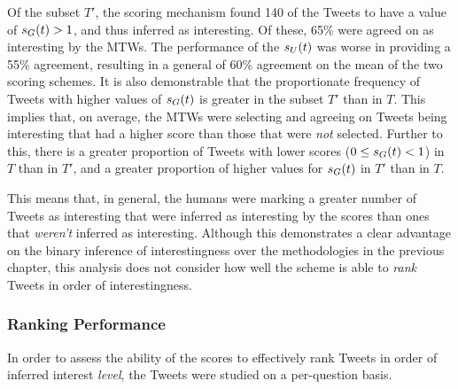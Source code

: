 Of the subset $T'$, the scoring mechanism found 140 of the Tweets to have a value of $s_G(t) > 1$, and thus inferred as interesting. Of these, 65\% were agreed on as interesting by the MTWs. The performance of the $s_U(t)$ was worse in providing a 55\% agreement, resulting in a general of 60\% agreement on the mean of the two scoring schemes. It is also demonstrable that the proportionate frequency of Tweets with higher values of $s_G(t)$ is greater in the subset $T'$ than in $T$. This implies that, on average, the MTWs were selecting and agreeing on Tweets being interesting that had a higher score than those that were \textit{not} selected. Further to this, there is a greater proportion of Tweets with lower scores ($0 \leq s_G(t) < 1$) in $T$ than in $T'$, and a greater proportion of higher values for $s_G(t)$ in $T'$ than in $T$.

This means that, in general, the humans were marking a greater number of Tweets as interesting that were inferred as interesting by the scores than ones that \textit{weren't} inferred as interesting. Although this demonstrates a clear advantage on the binary inference of interestingness over the methodologies in the previous chapter, this analysis does not consider how well the scheme is able to \textit{rank} Tweets in order of interestingness.


\subsubsection{Ranking Performance}

In order to assess the ability of the scores to effectively rank Tweets in order of inferred interest \textit{level}, the Tweets were studied on a per-question basis.

